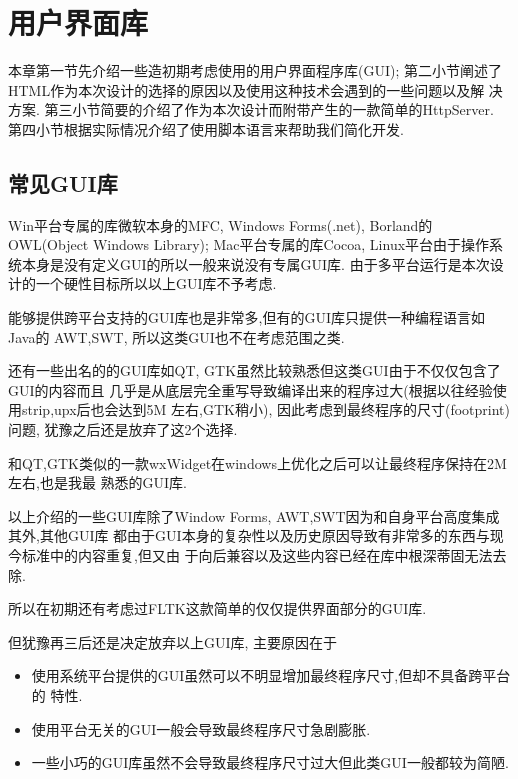 \chapter{用户界面库}
本章第一节先介绍一些造初期考虑使用的用户界面程序库(GUI);
第二小节阐述了HTML作为本次设计的选择的原因以及使用这种技术会遇到的一些问题以及解
决方案.
第三小节简要的介绍了作为本次设计而附带产生的一款简单的HttpServer.
第四小节根据实际情况介绍了使用脚本语言来帮助我们简化开发.
\section{常见GUI库}
Win平台专属的库微软本身的MFC, Windows Forms(.net), Borland的OWL(Object Windows Library);
Mac平台专属的库Cocoa,
Linux平台由于操作系统本身是没有定义GUI的所以一般来说没有专属GUI库.
由于多平台运行是本次设计的一个硬性目标所以以上GUI库不予考虑.

能够提供跨平台支持的GUI库也是非常多,但有的GUI库只提供一种编程语言如Java的
AWT,SWT, 所以这类GUI也不在考虑范围之类.

还有一些出名的的GUI库如QT, GTK虽然比较熟悉但这类GUI由于不仅仅包含了GUI的内容而且
几乎是从底层完全重写导致编译出来的程序过大(根据以往经验使用strip,upx后也会达到5M
左右,GTK稍小), 因此考虑到最终程序的尺寸(footprint)问题, 犹豫之后还是放弃了这2个选择.

和QT,GTK类似的一款wxWidget在windows上优化之后可以让最终程序保持在2M左右,也是我最
熟悉的GUI库.

以上介绍的一些GUI库除了Window Forms, AWT,SWT因为和自身平台高度集成其外,其他GUI库
都由于GUI本身的复杂性以及历史原因导致有非常多的东西与现今标准中的内容重复,但又由
于向后兼容以及这些内容已经在库中根深蒂固无法去除. 

所以在初期还有考虑过FLTK这款简单的仅仅提供界面部分的GUI库.

但犹豫再三后还是决定放弃以上GUI库, 主要原因在于
\begin{itemize}
	\item 使用系统平台提供的GUI虽然可以不明显增加最终程序尺寸,但却不具备跨平台的
		特性.
	\item 使用平台无关的GUI一般会导致最终程序尺寸急剧膨胀.
	\item 一些小巧的GUI库虽然不会导致最终程序尺寸过大但此类GUI一般都较为简陋.
\end{itemize}

